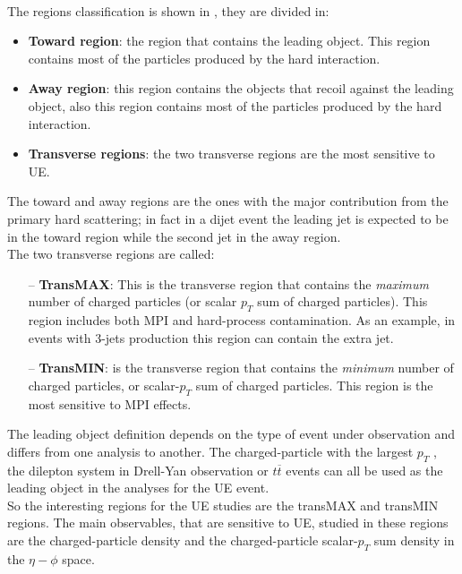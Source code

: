 %
\\
The regions classification is shown in , they are divided in:
\begin{itemize}
	\item \textbf{Toward region}: the region that contains the leading object. This region contains most of the particles produced by the hard interaction.
	\item \textbf{Away region}: this region contains the objects that recoil against the leading object, also this region contains most of the particles produced by the hard interaction.
	\item \textbf{Transverse regions}: the two transverse regions are the most sensitive to UE.
\end{itemize}
The toward and away regions are the ones with the major contribution from the primary hard scattering; in fact in a dijet event the leading jet is expected to be in the toward region while the second  jet in the away region.  
\\
The two transverse regions are called:
\begin{itemize}
	\item[--] \textbf{TransMAX}: This is the transverse region that contains the \textit{maximum} number of charged particles (or scalar $p_T$ sum of charged particles). This region includes both MPI and hard-process contamination.
As an example, in events with 3-jets production this region can contain the extra jet.	
	\item[--] \textbf{TransMIN}: is the transverse region that contains the \textit{minimum} number of charged particles, or scalar-$p_T$ sum of charged particles. This region is the most  sensitive to MPI effects.
\end{itemize}

\noindent The leading object definition depends on the type of event under observation and differs from one analysis to another. 
The charged-particle with the largest $p_T$ \cite{CMS-PAS-FSQ-15-007}, the dilepton system in Drell-Yan observation \cite{CMS:2012oqb, CMS:2017ngy} or $t\overline{t}$ events \cite{CMS:2018mdd} can all be used as the leading object in the analyses for the UE event.
\\
So the interesting regions for the UE studies are the transMAX and transMIN regions. The main observables, that are sensitive to UE,  studied in these regions are the charged-particle density and the charged-particle scalar-$p_T$ sum density in the $\eta-\phi$ space.



